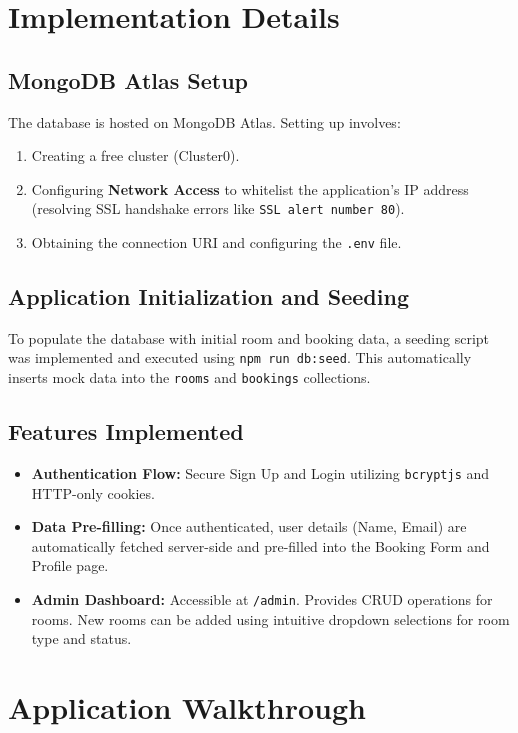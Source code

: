 \documentclass[12pt, a4paper]{article}
\begin{document}
\section{Implementation Details}

\subsection{MongoDB Atlas Setup}
The database is hosted on MongoDB Atlas. Setting up involves:
\begin{enumerate}
    \item Creating a free cluster (Cluster0).
    \item Configuring \textbf{Network Access} to whitelist the application's IP address (resolving SSL handshake errors like \texttt{SSL alert number 80}).
    \item Obtaining the connection URI and configuring the \texttt{.env} file.
\end{enumerate}

\subsection{Application Initialization and Seeding}
To populate the database with initial room and booking data, a seeding script was implemented and executed using \texttt{npm run db:seed}. This automatically inserts mock data into the \texttt{rooms} and \texttt{bookings} collections.

\subsection{Features Implemented}
\begin{itemize}
    \item \textbf{Authentication Flow:} Secure Sign Up and Login utilizing \texttt{bcryptjs} and HTTP-only cookies.
    \item \textbf{Data Pre-filling:} Once authenticated, user details (Name, Email) are automatically fetched server-side and pre-filled into the Booking Form and Profile page.
    \item \textbf{Admin Dashboard:} Accessible at \texttt{/admin}. Provides CRUD operations for rooms. New rooms can be added using intuitive dropdown selections for room type and status.
\end{itemize}

\section{Application Walkthrough}
\end{document}
